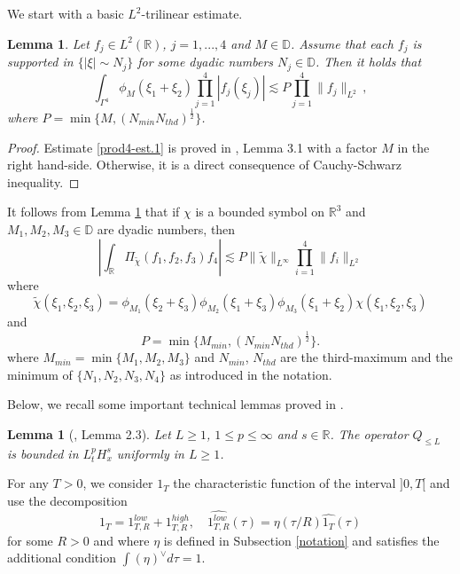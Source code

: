 \documentclass{amsart}
\newtheorem{lemma}[theorem]{Lemma}
\theoremstyle{definition}
\theoremstyle{remark}
\def\R{{\mathbb R}}
\def\D{{\mathbb D}}
\numberwithin{equation}{section}
\begin{document}
We start with a basic $L^2$-trilinear estimate.
\begin{lemma}\label{prod4-est}
 Let $f_j\in L^2(\mathbb R)$, $j=1,...,4$ and $M \in \mathbb D$. Assume that each $f_j$ is supported in $\{|\xi|\sim N_j\}$ for some dyadic numbers $N_j\in \D$. Then it holds that
\begin{equation} \label{prod4-est.1}
\int_{\Gamma^4} \phi_M(\xi_1+\xi_2) \prod_{j=1}^4|f_j(\xi_j)| \lesssim P \prod_{j=1}^4 \|f_j\|_{L^2} \, ,
\end{equation}
where $P=\min\{M, (N_{min}N_{thd})^{\frac 12}\}$. 
\end{lemma}
\begin{proof}
  Estimate \eqref{prod4-est.1} is proved in \cite{MPV2}, Lemma 3.1 with a factor $M$ in the right hand-side. Otherwise, it is a direct consequence of Cauchy-Schwarz inequality.
\end{proof}

It follows from Lemma \ref{prod4-est} that if $\chi$ is a bounded symbol on $\R^3$ and $M_1,M_2,M_3\in \D$ are dyadic numbers, then
\begin{equation}\label{l2tri-basic}
  \left|\int_\R \Pi_{\widetilde{\chi}}(f_1,f_2,f_3)f_4 \right| \lesssim P \|\widetilde{\chi}\|_{L^\infty} \prod_{i=1}^4 \|f_i\|_{L^2}
\end{equation}
where
\begin{equation}\label{def:chitilde}
  \widetilde{\chi}(\xi_1,\xi_2,\xi_3) = \phi_{M_1}(\xi_2+\xi_3)\phi_{M_2}(\xi_1+\xi_3)\phi_{M_3}(\xi_1+\xi_2) \chi(\xi_1,\xi_2,\xi_3)
\end{equation}
and
\begin{equation}\label{def:P}
  P = \min\{M_{min}, (N_{min}N_{thd})^{\frac 12}\} .
\end{equation}
where $M_{min}=\min\{M_1,M_2,M_3\}$ and $N_{min}$, $N_{thd}$ are the third-maximum and the minimum of $\{N_1,N_2,N_3,N_4\}$ as introduced in the notation. 

Below, we recall some important technical lemmas proved in \cite{MV}.

\begin{lemma}[\cite{MV}, Lemma 2.3] \label{QLbound}
Let $L\ge 1$, $1\le p\le\infty$ and $s\in\R$. The operator $Q_{\le L}$ is bounded in $L^p_tH^s_x$ uniformly in $L\ge 1$.
\end{lemma}

For any $T>0$, we consider $1_T$ the characteristic function of the interval $]0,T[$ and use the decomposition
\begin{equation}\label{ind-dec}
1_T = 1_{T,R}^{low}+1_{T,R}^{high},\quad \widehat{1_{T,R}^{low}}(\tau)=\eta(\tau/R)\widehat{1_T}(\tau)
\end{equation}
for some $R>0$ and where $\eta$ is defined in Subsection \ref{notation} and satisfies the additional condition $\int (\eta)^{\vee}d\tau=1$.
\end{document}
